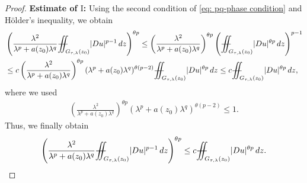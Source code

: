\documentclass[notitlepage,11pt,reqno]{amsart}
\theoremstyle{definition}
\numberwithin{equation}{section}
\newcommand{\iintss}{{\int\hspace{-0.28cm}\int}}
\newcommand{ \miints }{{\iintss\hspace{-0.56cm} -\hspace{-0.15cm}-}}
\newcommand{\miint}[1]{{\miints_{\hspace{-0.13cm}#1}}}
\begin{document}
\begin{proof}
\noindent\textbf{Estimate of $\mathrm{I}$:} Using the second condition of \eqref{eq: pq-phase condition} and H\"{o}lder's inequality, we obtain
\begin{align*}
    &\left(\frac{\lambda^2}{\lambda^p+a(z_0)\lambda^q}\miint{G_{\tau, \lambda}(z_0)}|Du|^{p-1}\,dz\right)^{\theta p}\leq \left(\frac{\lambda^2}{\lambda^p+a(z_0)\lambda^q}\right)^{\theta p}\left(\miint{G_{\tau, \lambda}(z_0)} |Du|^{\theta p}\,dz\right)^{p-1}\\
    &\leq c\left(\frac{\lambda^2}{\lambda^p+a(z_0)\lambda^q}\right)^{\theta p}(\lambda^p+a(z_0)\lambda^q)^{\theta (p-2)} \miint{G_{\tau, \lambda}(z_0)} |Du|^{\theta p}\,dz \leq c \miint{G_{\tau, \lambda}(z_0)}|Du|^{\theta p}\, dz,
\end{align*}
where we used
\begin{align*}
\left(\frac{\lambda^2}{\lambda^p+a(z_0)\lambda^q}\right)^{\theta p}(\lambda^p+a(z_0)\lambda^q)^{\theta (p-2)} \leq 1 .   
\end{align*}
Thus, we finally obtain
\begin{align*}
\left(\frac{\lambda^2}{\lambda^p+a(z_0)\lambda^q}\miint{G_{\tau, \lambda}(z_0)}|Du|^{p-1}\,dz\right)^{\theta p} \leq c \miint{G_{\tau, \lambda}(z_0)} |Du|^{\theta p}\,dz.    
\end{align*}


\end{proof}
\end{document}
